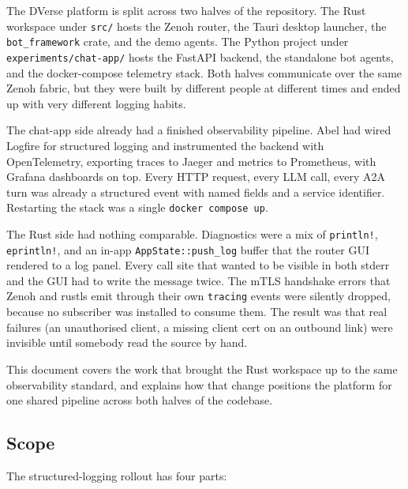 \documentclass[11pt,a4paper]{article}
\begin{document}
The DVerse platform is split across two halves of the
repository. The Rust workspace under \texttt{src/} hosts the
Zenoh router, the Tauri desktop launcher, the
\texttt{bot\_framework} crate, and the demo agents. The Python
project under \texttt{experiments/chat-app/} hosts the FastAPI
backend, the standalone bot agents, and the docker-compose
telemetry stack. Both halves communicate over the same Zenoh
fabric, but they were built by different people at different
times and ended up with very different logging habits.

The chat-app side already had a finished observability pipeline.
Abel had wired Logfire for structured logging and instrumented
the backend with OpenTelemetry, exporting traces to Jaeger and
metrics to Prometheus, with Grafana dashboards on top. Every HTTP
request, every LLM call, every A2A turn was already a structured
event with named fields and a service identifier. Restarting the
stack was a single \texttt{docker compose up}.

The Rust side had nothing comparable. Diagnostics were a mix of
\texttt{println!}, \texttt{eprintln!}, and an in-app
\texttt{AppState::push\_log} buffer that the router GUI rendered
to a log panel. Every call site that wanted to be visible in both
stderr and the GUI had to write the message twice. The mTLS
handshake errors that Zenoh and rustls emit through their own
\texttt{tracing} events were silently dropped, because no
subscriber was installed to consume them. The result was that
real failures (an unauthorised client, a missing client cert on
an outbound link) were invisible until somebody read the source
by hand.

This document covers the work that brought the Rust workspace up
to the same observability standard, and explains how that change
positions the platform for one shared pipeline across both halves
of the codebase.

\subsection{Scope}

The structured-logging rollout has four parts:
\end{document}
